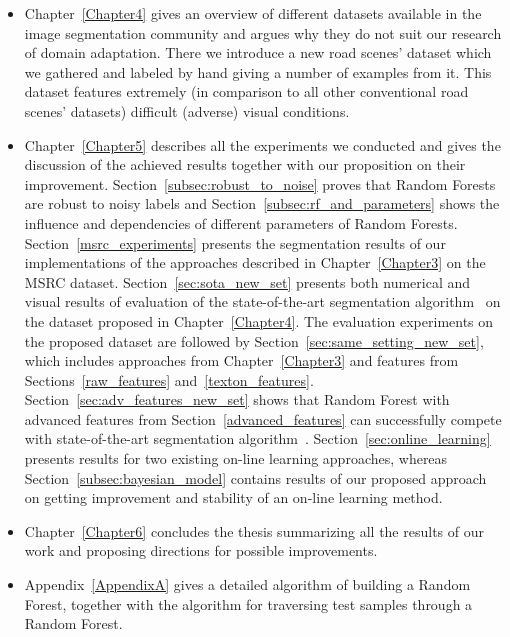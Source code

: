 \begin{itemize}
 \item Chapter~\ref{Chapter4} gives an overview of different datasets available in the image segmentation community and argues why they do not
 suit our research of domain adaptation.
 There we introduce a new road scenes' dataset which we gathered and labeled by hand giving a number of examples from it. 
 This dataset features extremely (in comparison to all other conventional road scenes' datasets) difficult (adverse) visual conditions.
 
 \item Chapter~\ref{Chapter5} describes all the experiments we conducted and gives the discussion of the achieved results together with our
 proposition on their improvement. Section~\ref{subsec:robust_to_noise} proves that Random Forests are robust to noisy labels
 and Section~\ref{subsec:rf_and_parameters} shows the influence and dependencies of different parameters of Random Forests. Section~\ref{msrc_experiments}
 presents the segmentation results of our implementations of the approaches described in Chapter~\ref{Chapter3} on the MSRC dataset. 
 Section~\ref{sec:sota_new_set} presents both numerical and visual results of evaluation of the state-of-the-art segmentation 
 algorithm~\cite{Krahenbuhl2011} on the dataset proposed in Chapter~\ref{Chapter4}.
 The evaluation experiments on the proposed dataset are followed by Section~\ref{sec:same_setting_new_set}, 
 which includes approaches from Chapter~\ref{Chapter3} and features from Sections~\ref{raw_features} and~\ref{texton_features}.
 Section~\ref{sec:adv_features_new_set} shows that Random Forest with advanced features from Section~\ref{advanced_features} can successfully
 compete with state-of-the-art segmentation algorithm~\cite{Krahenbuhl2011}.
 Section~\ref{sec:online_learning} presents results for two existing on-line learning approaches, whereas Section~\ref{subsec:bayesian_model} contains 
 results of our proposed approach on getting improvement and stability of an on-line learning method.
 
 \item Chapter~\ref{Chapter6} concludes the thesis summarizing all the results of our work and proposing directions for possible improvements.
 
 \item Appendix~\ref{AppendixA} gives a detailed algorithm of building a Random Forest, together with the algorithm for traversing test samples through
 a Random Forest.
\end{itemize}
